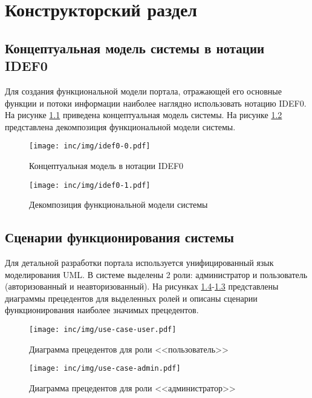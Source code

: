 \chapter{Конструкторский раздел}


\section{Концептуальная модель системы в нотации IDEF0}


Для создания функциональной модели портала, отражающей его основные функции и потоки информации наиболее наглядно использовать нотацию IDEF0. На рисунке \ref{img:idef0-0} приведена концептуальная модель системы. На рисунке \ref{img:idef0-1} представлена декомпозиция функциональной модели системы.

 \begin{figure}[h!]
  \centering
  \texttt{[image: inc/img/idef0-0.pdf]}
  \caption{Концептуальная модель в нотации IDEF0}
  \label{img:idef0-0}
\end{figure}

 \begin{figure}[h!]
  \centering
  \texttt{[image: inc/img/idef0-1.pdf]}
  \caption{Декомпозиция функциональной модели системы}
  \label{img:idef0-1}
\end{figure}


\section{Сценарии функционирования системы}


Для детальной разработки портала используется унифицированный язык моделирования UML. В системе выделены 2 роли: администратор и пользователь (авторизованный и неавторизованный). На рисунках \ref{img:use-case-admin}-\ref{img:use-case-user} представлены диаграммы прецедентов для выделенных ролей и описаны сценарии функционирования наиболее значимых прецедентов.


 \begin{figure}[h!]
  \centering
  \texttt{[image: inc/img/use-case-user.pdf]}
  \caption{Диаграмма прецедентов для роли <<пользователь>>}
  \label{img:use-case-user}
\end{figure}

 \begin{figure}[h!]
  \centering
  \texttt{[image: inc/img/use-case-admin.pdf]}
  \caption{Диаграмма прецедентов для роли <<администратор>>}
  \label{img:use-case-admin}
\end{figure}


